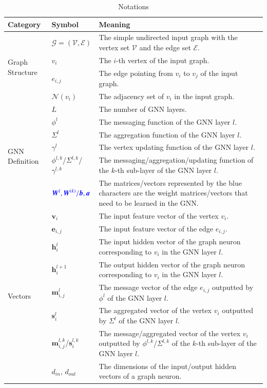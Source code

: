 \begin{table}[h]
    \caption{Notations}
    \label{tab:notations}
    \centering
    \small
    \begin{tabular}{p{3em}lp{35em}}
        \toprule
       Category & Symbol & Meaning \\
        \midrule
        \multirow[c]{4}{3em}{Graph Structure}& $\mathcal{G}=(\mathcal{V}, \mathcal{E})$ & The simple undirected input graph with the vertex set $\mathcal{V}$ and the edge set $\mathcal{E}$. \\
        & $v_i$ & The $i$-th vertex of the input graph. \\
        & $e_{i,j}$ & The edge pointing from $v_i$ to $v_j$ of the input graph. \\
        & $\mathcal{N}(v_i)$ & The adjacency set of $v_i$ in the input graph. \\ \midrule
        \multirow[c]{6}{3em}{GNN Definition}& $L$ & The number of GNN layers. \\
        & $\phi^l$ & The messaging function of the GNN layer $l$. \\
        & $\Sigma^l$ & The aggregation function of the GNN layer $l$. \\
        & $\gamma^l$ & The vertex updating function of the GNN layer $l$. \\ 
        & $\phi^{l,k}$/$\Sigma^{l,k}$/$\gamma^{l,k}$ & The messaging/aggregation/updating function of the $k$-th sub-layer of the GNN layer  $l$.\\
        & $\textcolor{blue}{\boldsymbol{W}^l, \boldsymbol{W}^{(k)}/\boldsymbol{b}, \boldsymbol{a}}$ & The matrices/vectors represented by the blue characters are the weight matrices/vectors that need to be learned in the GNN. \\  \midrule
        \multirow[c]{8}{3em}{Vectors}& $\boldsymbol{v}_i$ & The input feature vector of the vertex $v_i$. \\
        & $\boldsymbol{e}_{i,j}$ & The input feature vector of the edge $e_{i,j}$.  \\
        & $\boldsymbol{h}_i^{l}$ &  The {input} hidden vector of the graph neuron corresponding to $v_i$ in the GNN layer $l$. \\
        & $\boldsymbol{h}_i^{l+1}$ &  The {output} hidden vector of the graph neuron corresponding to $v_i$ in the GNN layer $l$.\\
        & $\boldsymbol{m}_{i,j}^l$ & The message vector of the edge $e_{i,j}$ outputted by $\phi^l$ of the GNN layer $l$. \\
        & $\boldsymbol{s}_{i}^l$ & The aggregated vector of the vertex $v_i$ outputted by $\Sigma^l$ of the GNN layer $l$. \\
        & $\boldsymbol{m}_{i,j}^{l,k}$/$\boldsymbol{s}_{i}^{l,k}$ & The message/aggregated vector of the vertex $v_i$ outputted by $\phi^{l,k}$/$\Sigma^{l,k}$ of the $k$-th sub-layer of the GNN layer $l$. \\
        & $d_{in}$, $d_{out}$ &  The dimensions of the input/output hidden vectors of a graph neuron. \\
        \bottomrule
        
    \end{tabular}
\end{table}

